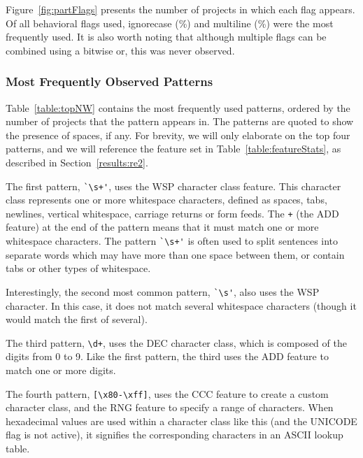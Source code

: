  Figure~\ref{fig:partFlags} presents the number of projects in which each flag appears.  Of all behavioral flags used, ignorecase (\%) and multiline (\%) were the most frequently used.  It is also worth noting that although multiple flags can be combined using a bitwise or, this was never observed.


\subsubsection{Most Frequently Observed Patterns}

Table~\ref{table:topNW} contains the most frequently used patterns, ordered by the number of projects that the pattern appears in.  The patterns are quoted to show the presence of spaces, if any.  For brevity, we will only elaborate on the top four patterns, and we will reference the feature set in Table~\ref{table:featureStats}, as described in Section~\ref{results:re2}.

The first pattern, \verb!`\s+'!, uses the WSP character class feature.  This character class represents one or more whitespace characters,  defined as spaces, tabs, newlines, vertical whitespace, carriage returns or form feeds.  The \verb!+! (the ADD feature) at the end of the pattern means that it must match one or more whitespace characters.  The pattern \verb!`\s+'! is often used to split sentences into separate words which may have more than one space between them, or contain tabs or other types of whitespace.

Interestingly, the second most common pattern, \verb!`\s'!, also uses the WSP character. In this case, it does not match several whitespace characters (though it would match the first of several).

The third pattern, \verb!\d+!,  uses the DEC character class, which is composed of the digits from 0 to 9.  Like the first pattern, the third uses the ADD feature to match one or more digits.

The fourth pattern, \verb![\x80-\xff]!, uses the CCC feature to create a custom character class, and the RNG feature to specify a range of characters.
When hexadecimal values are used within a character class like this (and the UNICODE flag is not active), it signifies the corresponding characters in an ASCII lookup table.


